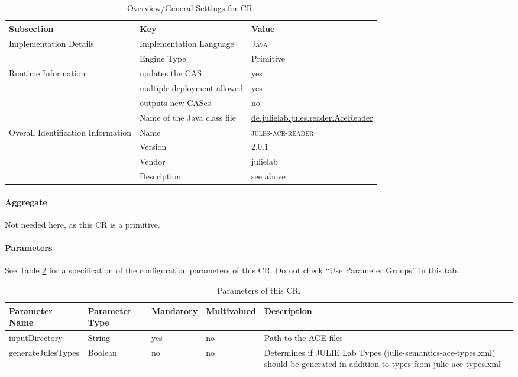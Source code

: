 \documentclass[11pt,a4paper,halfparskip]{scrartcl}
\begin{document}
\begin{table}[h!]
  \centering
  \begin{tabular}{|p{4cm}|p{4cm}|p{6cm}|}
    \hline
    Subsection & Key & Value \\
    \hline\hline
    Implementation Details & Implementation Language &  \textsc{Java} \\
    \cline{2-3}
    & Engine Type & Primitive\\
    \hline
    Runtime Information & updates the CAS & yes  \\
    \cline{2-3}
    & multiple deployment allowed & yes \\
    \cline{2-3}
    & outputs new CASes & no \\
    \cline{2-3}
    & Name of the Java class file & \url{de.julielab.jules.reader.AceReader}\\
    \hline
    Overall Identification Information & Name & \textsc{jules-ace-reader}
\\
    \cline{2-3}
    & Version & 2.0.1 \\
    \cline{2-3}
    & Vendor & julielab\\
    \cline{2-3}
    & Description & see above\\
    \hline
  \end{tabular}
  \caption{Overview/General Settings for CR.}
  \label{tab:overview}
\end{table}


\paragraph{Aggregate}
Not needed here, as this CR is a primitive.

\paragraph{Parameters}
\label{sss:parameters}

See Table \ref{tab:parameters} for a specification of the
configuration parameters of this CR. Do not check ``Use Parameter
Groups'' in this tab.

\begin{table}[h!]
  \centering
  \begin{tabular}{|p{4cm}|p{2cm}|p{2cm}|p{2cm}|p{4cm}|}
    \hline 
    Parameter Name & Parameter Type & Mandatory & Multivalued & Description \\
   \hline \hline
	inputDirectory & String & yes & no & Path to the ACE files\\
	generateJulesTypes & Boolean & no & no & Determines if JULIE Lab Types (julie-semantics-ace-types.xml) should be generated in addition to types from julie-ace-types.xml\\
  \hline
  \end{tabular}
  \caption{Parameters of this CR.}
  \label{tab:parameters}
\end{table}
\end{document}
